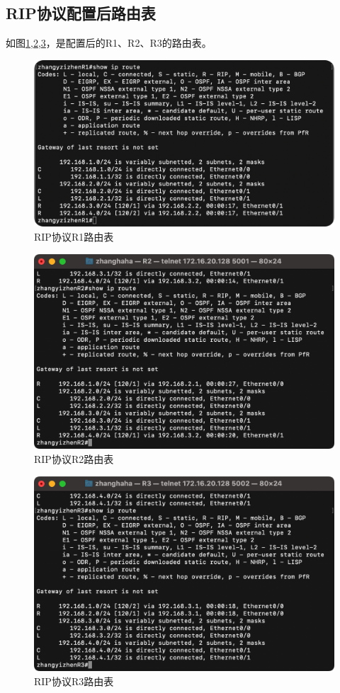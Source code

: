 \documentclass[a4paper,12pt]{report}
\begin{document}
\begin{spacing}{1.5}
\subsection{RIP协议配置后路由表}
如图\ref{22},\ref{23},\ref{24}，是配置后的R1、R2、R3的路由表。
\begin{figure}[htb!]
  \centering
\includegraphics[width=12cm]{figure/rip-r1.png}
  \caption{RIP协议R1路由表}
  \label{22}

\end{figure}

\begin{figure}[htb!]
  \centering
\includegraphics[width=12cm]{figure/rip-r2.png}
\caption{RIP协议R2路由表}
\label{23}
\end{figure}

\begin{figure}[htb!]
  \centering
\includegraphics[width=12cm]{figure/rip-r3.png}
\caption{RIP协议R3路由表}
\label{24}
\end{figure}


\end{spacing}
\end{document}
